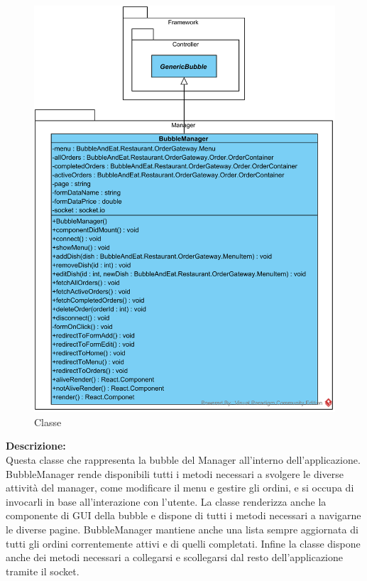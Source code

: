 \paragraph[::Restaurant::Manager::BubbleManager]{\class}\mbox{}\\ \label{\class}
\begin{figure}[H]
	\centering
	\includegraphics[width=14cm]{./diagrammi/demo/client/manager.png}
	\caption{Classe \class}
\end{figure}
\textbf{Descrizione:}\\
Questa classe che rappresenta la bubble del Manager all'interno dell'applicazione. BubbleManager rende disponibili tutti i metodi necessari a svolgere le diverse attività del manager, come modificare il menu e gestire gli ordini, e si occupa di invocarli in base all'interazione con l'utente. La classe renderizza anche la componente di GUI della bubble e dispone di tutti i metodi necessari a navigarne le diverse pagine. BubbleManager mantiene anche una lista sempre aggiornata di tutti gli ordini correntemente attivi e di quelli completati. Infine la classe dispone anche dei metodi necessari a collegarsi e scollegarsi dal resto dell'applicazione tramite il socket.

